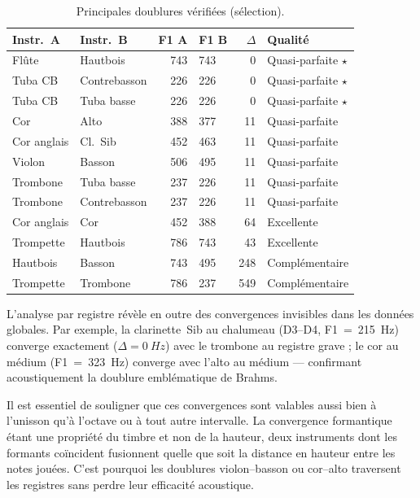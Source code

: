 \documentclass[11pt,a4paper]{article}
\begin{document}
\begin{table}[ht]
\centering
\caption{Principales doublures vérifiées (sélection).}
\label{tab:doublures}
\small
\begin{tabular}{llrlrl}
\toprule
Instr.~A & Instr.~B & F1 A & F1 B & $\Delta$ & Qualité \\
\midrule
Flûte        & Hautbois     & 743  & 743  & 0   & Quasi-parfaite $\star$ \\
Tuba CB      & Contrebasson & 226  & 226  & 0   & Quasi-parfaite $\star$ \\
Tuba CB      & Tuba basse   & 226  & 226  & 0   & Quasi-parfaite $\star$ \\
Cor          & Alto         & 388  & 377  & 11  & Quasi-parfaite \\
Cor anglais  & Cl.~Sib      & 452  & 463  & 11  & Quasi-parfaite \\
Violon       & Basson       & 506  & 495  & 11  & Quasi-parfaite \\
Trombone     & Tuba basse   & 237  & 226  & 11  & Quasi-parfaite \\
Trombone     & Contrebasson & 237  & 226  & 11  & Quasi-parfaite \\
Cor anglais  & Cor          & 452  & 388  & 64  & Excellente \\
Trompette    & Hautbois     & 786  & 743  & 43  & Excellente \\
Hautbois     & Basson       & 743  & 495  & 248 & Complémentaire \\
Trompette    & Trombone     & 786  & 237  & 549 & Complémentaire \\
\bottomrule
\end{tabular}
\end{table}

L'analyse par registre révèle en outre des convergences invisibles dans
les données globales. Par exemple, la clarinette~Sib au chalumeau (D3--D4,
F1~=~\SI{215}{Hz}) converge exactement ($\Delta = \SI{0}{Hz}$) avec le
trombone au registre grave ; le cor au médium (F1~=~\SI{323}{Hz})
converge avec l'alto au médium --- confirmant acoustiquement la doublure
emblématique de Brahms.

Il est essentiel de souligner que ces convergences sont valables aussi
bien à l'unisson qu'à l'octave ou à tout autre intervalle. La
convergence formantique étant une propriété du timbre et non de la
hauteur, deux instruments dont les formants coïncident fusionnent
quelle que soit la distance en hauteur entre les notes jouées. C'est
pourquoi les doublures violon--basson ou cor--alto traversent les
registres sans perdre leur efficacité acoustique.
\end{document}

